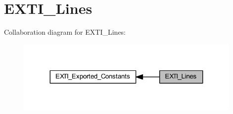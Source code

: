 \hypertarget{group___e_x_t_i___lines}{}\section{E\+X\+T\+I\+\_\+\+Lines}
\label{group___e_x_t_i___lines}
Collaboration diagram for E\+X\+T\+I\+\_\+\+Lines\+:
\nopagebreak
\begin{figure}[H]
\begin{center}
\leavevmode
\includegraphics[width=311pt]{group___e_x_t_i___lines}
\end{center}
\end{figure}
